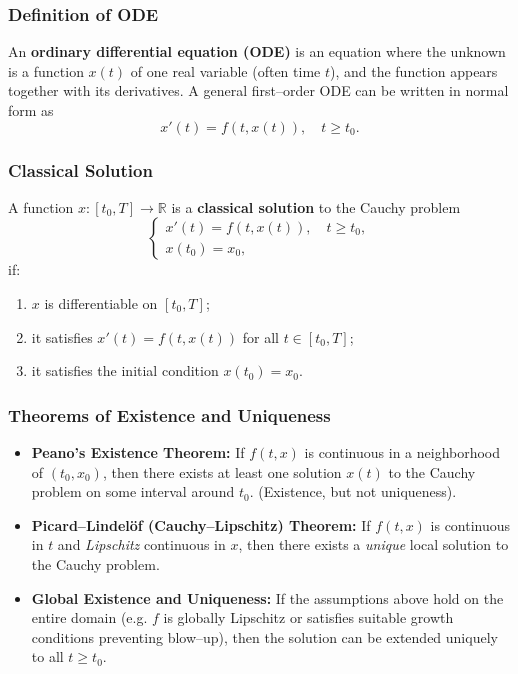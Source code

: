 \documentclass[12pt,a4paper]{book}
\theoremstyle{remark}
\newcommand{\RR}{\mathbb{R}}
\begin{document}
\subsubsection*{Definition of ODE}
An \textbf{ordinary differential equation (ODE)} is an equation where the unknown is a function $x(t)$ of one real variable (often time $t$), and the function appears together with its derivatives.  
A general first–order ODE can be written in normal form as
\[
x'(t) = f(t,x(t)), \quad t \geq t_0.
\]

\subsubsection*{Classical Solution}
A function $x:[t_0,T]\to\RR$ is a \textbf{classical solution} to the Cauchy problem
\[
\begin{cases}
x'(t) = f(t,x(t)), \quad t \geq t_0, \\
x(t_0) = x_0,
\end{cases}
\]
if:
\begin{enumerate}[label=\roman*)]
    \item $x$ is differentiable on $[t_0,T]$;
    \item it satisfies $x'(t) = f(t,x(t))$ for all $t \in [t_0,T]$;
    \item it satisfies the initial condition $x(t_0) = x_0$.
\end{enumerate}

\subsubsection*{Theorems of Existence and Uniqueness}
\begin{itemize}
    \item \textbf{Peano’s Existence Theorem:} If $f(t,x)$ is continuous in a neighborhood of $(t_0,x_0)$, then there exists at least one solution $x(t)$ to the Cauchy problem on some interval around $t_0$. (Existence, but not uniqueness).
    
    \item \textbf{Picard–Lindelöf (Cauchy–Lipschitz) Theorem:} If $f(t,x)$ is continuous in $t$ and \emph{Lipschitz} continuous in $x$, then there exists a \emph{unique} local solution to the Cauchy problem. 
    
    \item \textbf{Global Existence and Uniqueness:} If the assumptions above hold on the entire domain (e.g. $f$ is globally Lipschitz or satisfies suitable growth conditions preventing blow–up), then the solution can be extended uniquely to all $t \geq t_0$.
\end{itemize}
\end{document}
